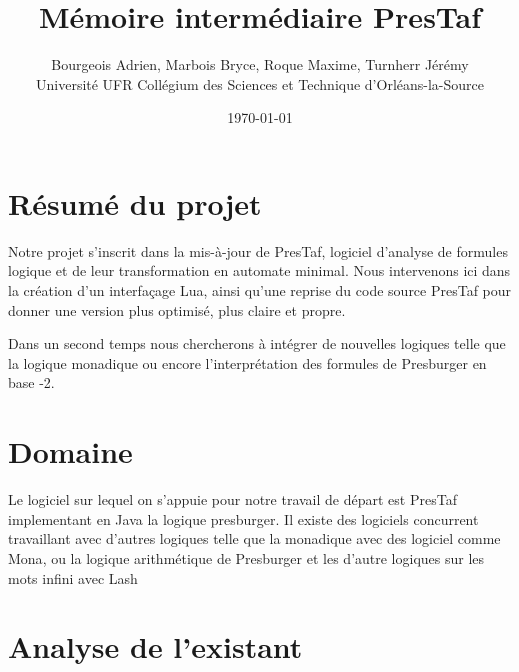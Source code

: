 \documentclass{article}%
\begin{document}
\title{Mémoire intermédiaire PresTaf}

\author{Bourgeois Adrien, Marbois Bryce, Roque Maxime, Turnherr Jérémy%
\\Université UFR Collégium des Sciences et Technique d'Orléans-la-Source}
\date{\today}
\maketitle



\clearpage

\tableofcontents

\cleardoublepage

\section{Résumé du projet}

Notre projet s'inscrit dans la mis-à-jour de PresTaf, logiciel d'analyse de formules logique et de leur transformation en automate minimal. Nous intervenons ici dans la création d'un interfaçage Lua, ainsi qu'une reprise du code source PresTaf pour donner une version plus optimisé, plus claire et propre.\\\par

Dans un second temps nous chercherons à intégrer de nouvelles logiques telle que la logique monadique ou encore l'interprétation des formules de Presburger en base -2.

\section{Domaine}

Le logiciel sur lequel on s'appuie pour notre travail de départ est PresTaf implementant en Java la logique \gls{presburger}\cite{ginsburg1966semigroups}. Il existe des logiciels concurrent travaillant avec d'autres logiques telle que la \gls{monadique}\cite{KlaEtAl:Mona} avec des logiciel comme Mona\cite{monamanual2001}, ou la logique arithmétique de Presburger et les d'autre logiques sur les mots infini avec Lash\cite{lash}

\section{Analyse de l'existant}
\end{document}
